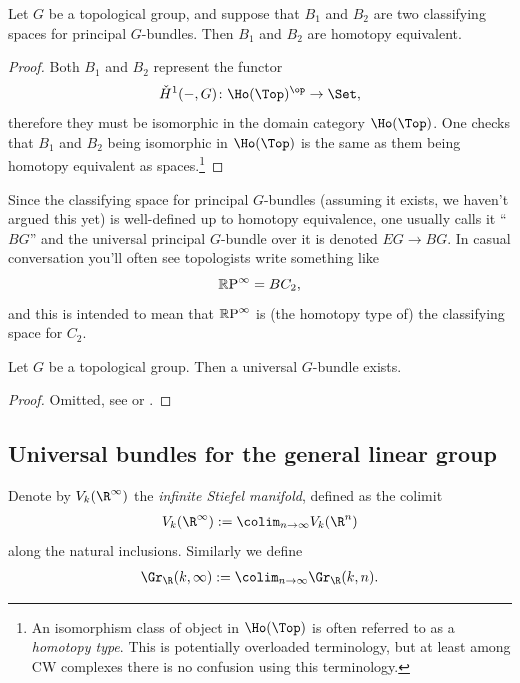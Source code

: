 \documentclass[11pt]{book}
\begin{document}
\begin{proposition}
Let $G$ be a topological group, and suppose that $B_1$ and $B_2$ are two classifying spaces for principal $G$-bundles. Then $B_1$ and $B_2$ are homotopy equivalent.
\end{proposition}
\begin{proof}
Both $B_1$ and $B_2$ represent the functor
\[
    \check{H}^1(-,G) \colon \Ho(\Top)^\op \to \Set,
\]
therefore they must be isomorphic in the domain category $\Ho(\Top)$. One checks that $B_1$ and $B_2$ being isomorphic in $\Ho(\Top)$ is the same as them being homotopy equivalent as spaces.\footnote{An isomorphism class of object in $\Ho(\Top)$ is often referred to as a \emph{homotopy type}. This is potentially overloaded terminology, but at least among CW complexes there is no confusion using this terminology.}
\end{proof}

\begin{notation}
Since the classifying space for principal $G$-bundles (assuming it exists, we haven't argued this yet) is well-defined up to homotopy equivalence, one usually calls it ``$BG$'' and the universal principal $G$-bundle over it is denoted $EG \to BG$. In casual conversation you'll often see topologists write something like
\[
{\mathbb{R}\text{P}}^\infty = BC_2,
\]
and this is intended to mean that ${\mathbb{R}\text{P}}^\infty$ is (the homotopy type of) the classifying space for $C_2$.
\end{notation}



\begin{theorem}
\label{thm:existence-universal-G-bundles}
Let $G$ be a topological group. Then a universal $G$-bundle exists.
\end{theorem}
\begin{proof} Omitted, see \cite[\S12.2]{AGP} or \cite[\S16.5]{maybook}.
\end{proof}

\subsection{Universal bundles for the general linear group}

\begin{notation} Denote by $V_k(\R^\infty)$ the \emph{infinite Stiefel manifold}, defined as the colimit
\begin{align*}
    V_k(\R^\infty) := \colim_{n\to\infty} V_k(\R^n)
\end{align*}
along the natural inclusions. Similarly we define
\begin{align*}
    \Gr_\R(k,\infty) := \colim_{n\to\infty} \Gr_\R(k,n).
\end{align*}
\end{notation}
\end{document}
